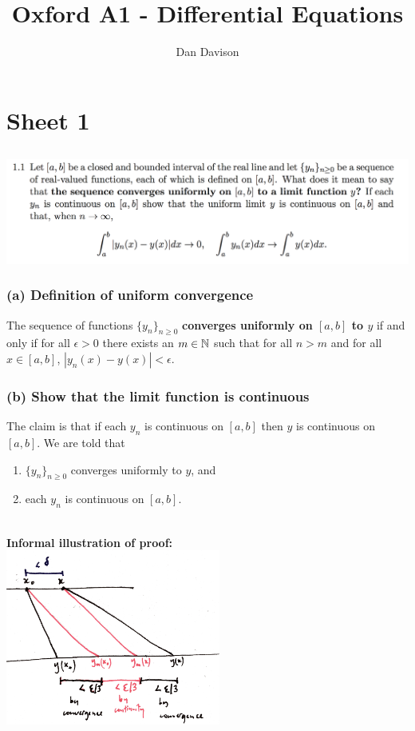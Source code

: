 \documentclass[12pt]{article}
\begin{document}
\title{Oxford A1 - Differential Equations }
\author{Dan Davison}
\maketitle

\section{Sheet 1}

\subsection*{} %
\begin{mdframed}
\includegraphics[width=450pt]{img/differential-equations-a1-1-1-a.png}
\end{mdframed}

\subsubsection*{(a) Definition of uniform convergence}
The sequence of functions $\{y_n\}_{n\geq 0}$ \textbf{converges uniformly on
  $[a, b]$ to $y$} if and only if for all $\epsilon > 0$ there exists an
$m \in \mathbb{N}$ such that for all $n > m$ and for all $x \in [a,b]$,
$|y_n(x) - y(x)| < \epsilon$.

\subsubsection*{(b) Show that the limit function is continuous}

The claim is that if each $y_n$ is continuous on $[a,b]$ then $y$ is
continuous on $[a,b]$. We are told that
\begin{enumerate}
\item $\{y_n\}_{n \geq 0}$ converges uniformly to $y$, and
\item each $y_n$ is continuous on $[a,b]$.
\end{enumerate}
~\\
\textbf{Informal illustration of proof:}\\
\includegraphics[width=200pt]{img/differential-equations-a1-1-1-a-diagram.png}\\
\end{document}
